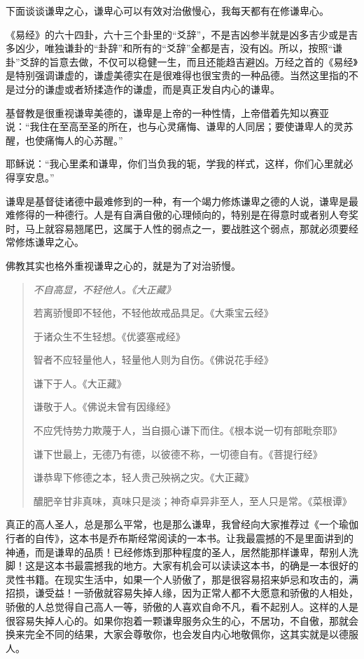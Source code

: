 \documentclass{ctexart}
\begin{document}
下面谈谈谦卑之心，谦卑心可以有效对治傲慢心，我每天都有在修谦卑心。

《易经》的六十四卦，六十三个卦里的“爻辞”，不是吉凶参半就是凶多吉少或是吉多凶少，唯独谦卦的“卦辞”和所有的“爻辞”全都是吉，没有凶。所以，按照“谦卦”爻辞的旨意去做，不仅可以稳健一生，而且还能趋吉避凶。万经之首的《易经》是特别强调谦虚的，谦虚美德实在是很难得也很宝贵的一种品德。当然这里指的不是过分的谦虚或者矫揉造作的谦虚，而是真正发自内心的谦卑。

基督教是很重视谦卑美德的，谦卑是上帝的一种性情，上帝借着先知以赛亚说：“我住在至高至圣的所在，也与心灵痛悔、谦卑的人同居；要使谦卑人的灵苏醒，也使痛悔人的心苏醒。”

耶稣说：“我心里柔和谦卑，你们当负我的轭，学我的样式，这样，你们心里就必得享安息。”

谦卑是基督徒诸德中最难修到的一种，有一个竭力修炼谦卑之德的人说，谦卑是最难修得的一种德行。人是有自满自傲的心理倾向的，特别是在得意时或者别人夸奖时，马上就容易翘尾巴，这属于人性的弱点之一，要战胜这个弱点，那就必须要经常修炼谦卑之心。

佛教其实也格外重视谦卑之心的，就是为了对治骄慢。

\begin{quotation}\it
    不自高显，不轻他人。《大正藏》

    若离骄慢即不轻他，不轻他故戒品具足。《大乘宝云经》

    于诸众生不生轻想。《优婆塞戒经》

    智者不应轻量他人，轻量他人则为自伤。《佛说花手经》

    谦下于人。《大正藏》

    谦敬于人。《佛说未曾有因缘经》

    不应凭恃势力欺蔑于人，当自摄心谦下而住。《根本说一切有部毗奈耶》

    谦下世最上，无德乃有德，以彼德不称，一切德自有。《菩提行经》

    谦恭卑下修德之本，轻人贵己殃祸之灾。《大正藏》

    醲肥辛甘非真味，真味只是淡；神奇卓异非至人，至人只是常。《菜根谭》
\end{quotation}

真正的高人圣人，总是那么平常，也是那么谦卑，我曾经向大家推荐过《一个瑜伽行者的自传》，这本书是乔布斯经常阅读的一本书。让我最震撼的不是里面讲到的神通，而是谦卑的品质！已经修炼到那种程度的圣人，居然能那样谦卑，帮别人洗脚！这是这本书最震撼我的地方。大家有机会可以读读这本书，的确是一本很好的灵性书籍。在现实生活中，如果一个人骄傲了，那是很容易招来妒忌和攻击的，满招损，谦受益！一骄傲就容易失掉人缘，因为正常人都不大愿意和骄傲的人相处，骄傲的人总觉得自己高人一等，骄傲的人喜欢自命不凡，看不起别人。这样的人是很容易失掉人心的。如果你抱着一颗谦卑服务众生的心，不居功，不自傲，那就会换来完全不同的结果，大家会尊敬你，也会发自内心地敬佩你，这其实就是以德服人。
\end{document}
